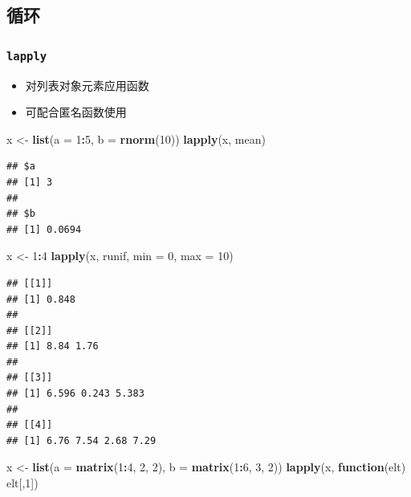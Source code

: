 \documentclass[]{book}
\newenvironment{Shaded}{\begin{snugshade}}{\end{snugshade}}
\newcommand{\ControlFlowTok}[1]{\textcolor[rgb]{0.13,0.29,0.53}{\textbf{#1}}}
\newcommand{\DataTypeTok}[1]{\textcolor[rgb]{0.13,0.29,0.53}{#1}}
\newcommand{\DecValTok}[1]{\textcolor[rgb]{0.00,0.00,0.81}{#1}}
\newcommand{\KeywordTok}[1]{\textcolor[rgb]{0.13,0.29,0.53}{\textbf{#1}}}
\newcommand{\NormalTok}[1]{#1}
\newcommand{\OperatorTok}[1]{\textcolor[rgb]{0.81,0.36,0.00}{\textbf{#1}}}
\newcommand{\StringTok}[1]{\textcolor[rgb]{0.31,0.60,0.02}{#1}}
\providecommand{\tightlist}{%
  \setlength{\itemsep}{0pt}\setlength{\parskip}{0pt}}
\begin{document}
\subsection{循环}

\hypertarget{lapply}{%
\subsubsection{\texorpdfstring{\texttt{lapply}}{lapply}}\label{lapply}}

\begin{itemize}
\tightlist
\item
  对列表对象元素应用函数
\item
  可配合匿名函数使用
\end{itemize}

\begin{Shaded}
\begin{Highlighting}[]
\NormalTok{x <-}\StringTok{ }\KeywordTok{list}\NormalTok{(}\DataTypeTok{a =} \DecValTok{1}\OperatorTok{:}\DecValTok{5}\NormalTok{, }\DataTypeTok{b =} \KeywordTok{rnorm}\NormalTok{(}\DecValTok{10}\NormalTok{))}
\KeywordTok{lapply}\NormalTok{(x, mean)}
\end{Highlighting}
\end{Shaded}

\begin{verbatim}
## $a
## [1] 3
## 
## $b
## [1] 0.0694
\end{verbatim}

\begin{Shaded}
\begin{Highlighting}[]
\NormalTok{x <-}\StringTok{ }\DecValTok{1}\OperatorTok{:}\DecValTok{4}
\KeywordTok{lapply}\NormalTok{(x, runif, }\DataTypeTok{min =} \DecValTok{0}\NormalTok{, }\DataTypeTok{max =} \DecValTok{10}\NormalTok{)}
\end{Highlighting}
\end{Shaded}

\begin{verbatim}
## [[1]]
## [1] 0.848
## 
## [[2]]
## [1] 8.84 1.76
## 
## [[3]]
## [1] 6.596 0.243 5.383
## 
## [[4]]
## [1] 6.76 7.54 2.68 7.29
\end{verbatim}

\begin{Shaded}
\begin{Highlighting}[]
\NormalTok{x <-}\StringTok{ }\KeywordTok{list}\NormalTok{(}\DataTypeTok{a =} \KeywordTok{matrix}\NormalTok{(}\DecValTok{1}\OperatorTok{:}\DecValTok{4}\NormalTok{, }\DecValTok{2}\NormalTok{, }\DecValTok{2}\NormalTok{), }\DataTypeTok{b =} \KeywordTok{matrix}\NormalTok{(}\DecValTok{1}\OperatorTok{:}\DecValTok{6}\NormalTok{, }\DecValTok{3}\NormalTok{, }\DecValTok{2}\NormalTok{))}
\KeywordTok{lapply}\NormalTok{(x, }\ControlFlowTok{function}\NormalTok{(elt) elt[,}\DecValTok{1}\NormalTok{])}
\end{Highlighting}
\end{Shaded}
\end{document}
